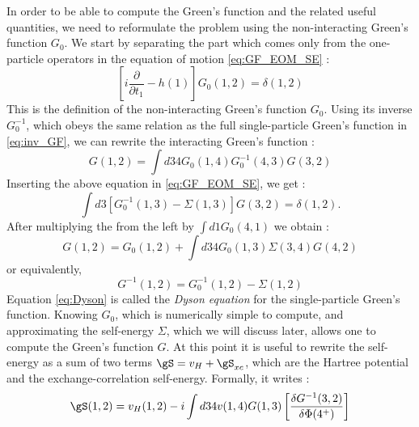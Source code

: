 In order to be able to compute the Green's function and the related useful quantities, we need to reformulate the problem using the non-interacting Green's function $G_0$. We start by separating the part which comes only from the one-particle operators in the equation of motion \eqref{eq:GF_EOM_SE} :
\begin{equation}
	\left[ i\frac{\partial}{\partial t_1} - h(1) \right] G_0(1,2) = \delta(1,2)
\end{equation}
This is the definition of the non-interacting Green's function $G_0$. Using its inverse $G_0^{-1}$, which obeys the same relation as the full single-particle Green's function in \eqref{eq:inv_GF}, we can rewrite the interacting Green's function :
\begin{equation}
	G(1,2) = \int d34 G_0(1,4)G^{-1}_0(4,3)G(3,2)
\end{equation}
Inserting the above equation in \eqref{eq:GF_EOM_SE}, we get :
\begin{equation}
	\int d3 \left[ G_0^{-1}(1,3) - \Sigma(1,3) \right] G(3,2) = \delta(1,2).
\end{equation}
After multiplying the from the left by $\int d1 G_0(4,1)$ we obtain :
\begin{equation}
	G(1,2) = G_0(1,2) + \int d34 G_0(1,3) \Sigma(3,4) G(4,2) \label{eq:Dyson}
\end{equation}
or equivalently,
\begin{equation}
	G^{-1}(1,2) = G_0^{-1}(1,2) - \Sigma(1,2)
\end{equation}
Equation \eqref{eq:Dyson} is called the \textit{Dyson equation} for the single-particle Green's function. Knowing $G_0$, which is numerically simple to compute, and approximating the self-energy $\Sigma$, which we will discuss later, allows one to compute the Green's function $G$. At this point it is useful to rewrite the self-energy as a sum of two terms $\gS = v_H + \gS_{xc}$, which are the Hartree potential and the exchange-correlation self-energy. Formally, it writes :
\begin{equation}
	\gS(1,2) = v_H(1,2) - i\int d34 v(1,4)G(1,3) \left[ \frac{\delta G^{-1}(3,2)}{\delta \Phi(4^+)} \right] 
\end{equation}

%

